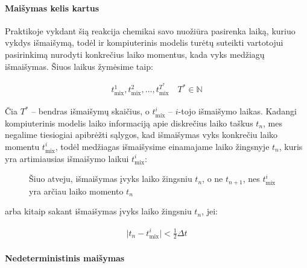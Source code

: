\paragraph{Maišymas kelis kartus}

Praktikoje vykdant šią reakcija chemikai savo nuožiūra pasirenka laiką, kuriuo vykdys išmaišymą, todėl ir kompiuterinis modelis turėtų suteikti vartotojui pasirinkimą nurodyti konkrečius laiko momentus, kada vyks medžiagų išmaišymas. Šiuos laikus žymėsime taip:

\begin{align}
    t^1_\text{mix}, t^2_\text{mix}, \dots, t^{T^*}_\text{mix} \quad T^*\in \mathbb{N}
\end{align}

Čia $T^*$ -- bendras išmaišymų skaičius, o $t^i_\text{mix}$ -- $i$-tojo išmaišymo laikas. Kadangi kompiuterinis modelis laiko informaciją apie diskrečius laiko taškus $t_n$, mes negalime tiesiogiai apibrėžti sąlygos, kad išmaišymas vyks konkrečiu laiko momentu $t^i_\text{mix}$, todėl medžiagas išmaišysime einamajame laiko žingsnyje $t_n$, kuris yra artimiausias išmaišymo laikui $t^i_\text{mix}$:

\newpage

\begin{figure}[!h]
\centering
\label{mix-inequality-graphic}
\caption{Šiuo atveju, išmaišymas įvyks laiko žingsniu $t_n$, o ne $t_{n+1}$, nes $t^i_\text{mix}$ yra arčiau laiko momento $t_n$}
\end{figure}

arba kitaip sakant išmaišymas įvyks laiko žingsniu $t_n$, jei:

\begin{align}
    \vert t_n - t^i_\text{mix} \vert < \frac{1}{2}\Delta t \label{mix-inequality}
\end{align}

\paragraph{Nedeterministinis maišymas}

